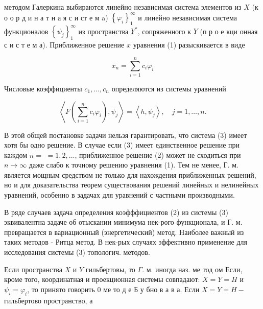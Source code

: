 \documentclass[10pt]{article}
\begin{document}
методом Галеркина выбираются линейно независимая система элементов из $X$ (к о о р д и н а т н а я с и ст е м a) $\left\{\varphi_{i}\right\}_{1}^{\infty}$ и линейно независимая система функционалов $\left\{\psi_{j}\right\}_{1}^{\infty}$ из пространства $Y^{*}$, сопряженного к $Y$ (п р о е кци онная с и с т е м а). Приближенное решение $x$ уравнения (1) разыскивается в виде



\[

x_{n}=\sum_{i=1}^{n} c_{i} \varphi_{i}

\]



Числовые коэффициенты $c_{1}, \ldots, c_{n}$ определяются из системы уравнений



\[

\left\langle F\left(\sum_{i=1}^{n} c_{i} \varphi_{i}\right), \psi_{j}\right\rangle=\left\langle h, \psi_{j}\right\rangle, \quad j=1, \ldots, n .

\]



В этой общей постановке задачи нельзя гарантировать, что система (3) имеет хотя бы одно решение. В случае если (3) имеет единственное решение при каждом $n=$ $=1,2, \ldots$, приближенное решение (2) может не сходиться при $n \rightarrow \infty$ даже слабо к точному решению уравнения (1). Тем не менее, Г. м. является мощным средством не только для нахождения приближенных решений, но и для доказательства теорем существования решений линейных и нелинейных уравнений, особенно в задачах для уравнений с частными производными.



В ряде случаев задача определения коэфффициентов (2) из системы (3) эквивалентна задаче об отыскании минимума нек-рого функционала, и Г. м. превращается в вариационный (энергетический) метод. Наиболее важный из таких методов - Ритца метод. В нек-рых случаях эффективно применение для исследования системы (3) топологич. методов.



Если пространства $X$ и $Y$ гильбертовы, то $\Gamma$. м. иногда наз. ме тод ом Если, кроме того, координатная и проекционная системы совпадают: $X=Y=H$ и $\psi_{i}=\varphi_{i}$, то принято говорить 0 ме то д е Б у бно в а в а. Если $X=Y=H-$ гильбертово пространство, а
\end{document}
